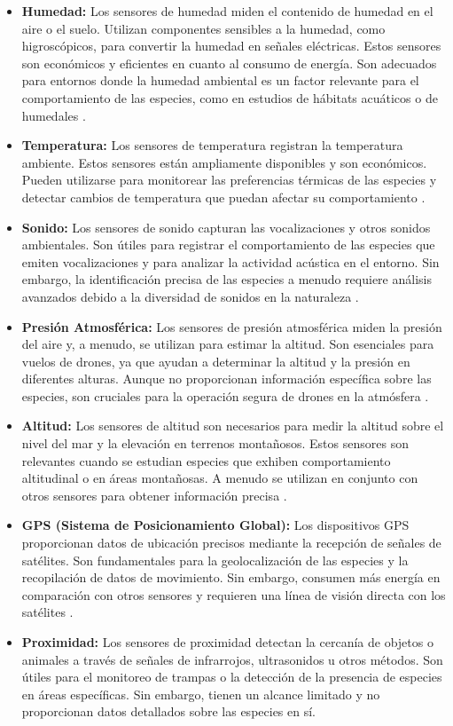 \begin{itemize}
\item \textbf{Humedad:} Los sensores de humedad miden el contenido de humedad en el aire o el suelo. Utilizan componentes sensibles a la humedad, como higroscópicos, para convertir la humedad en señales eléctricas. Estos sensores son económicos y eficientes en cuanto al consumo de energía. Son adecuados para entornos donde la humedad ambiental es un factor relevante para el comportamiento de las especies, como en estudios de hábitats acuáticos o de humedales \cite{75}.
\item \textbf{Temperatura:} Los sensores de temperatura registran la temperatura ambiente. Estos sensores están ampliamente disponibles y son económicos. Pueden utilizarse para monitorear las preferencias térmicas de las especies y detectar cambios de temperatura que puedan afectar su comportamiento \cite{76}.
\item \textbf{Sonido:} Los sensores de sonido capturan las vocalizaciones y otros sonidos ambientales. Son útiles para registrar el comportamiento de las especies que emiten vocalizaciones y para analizar la actividad acústica en el entorno. Sin embargo, la identificación precisa de las especies a menudo requiere análisis avanzados debido a la diversidad de sonidos en la naturaleza \cite{77}.
\item \textbf{Presión Atmosférica:} Los sensores de presión atmosférica miden la presión del aire y, a menudo, se utilizan para estimar la altitud. Son esenciales para vuelos de drones, ya que ayudan a determinar la altitud y la presión en diferentes alturas. Aunque no proporcionan información específica sobre las especies, son cruciales para la operación segura de drones en la atmósfera \cite{78}.
\item \textbf{Altitud:} Los sensores de altitud son necesarios para medir la altitud sobre el nivel del mar y la elevación en terrenos montañosos. Estos sensores son relevantes cuando se estudian especies que exhiben comportamiento altitudinal o en áreas montañosas. A menudo se utilizan en conjunto con otros sensores para obtener información precisa \cite{79}.
\item \textbf{GPS (Sistema de Posicionamiento Global):} Los dispositivos GPS proporcionan datos de ubicación precisos mediante la recepción de señales de satélites. Son fundamentales para la geolocalización de las especies y la recopilación de datos de movimiento. Sin embargo, consumen más energía en comparación con otros sensores y requieren una línea de visión directa con los satélites \cite{80}.
\item \textbf{Proximidad:} Los sensores de proximidad detectan la cercanía de objetos o animales a través de señales de infrarrojos, ultrasonidos u otros métodos. Son útiles para el monitoreo de trampas o la detección de la presencia de especies en áreas específicas. Sin embargo, tienen un alcance limitado y no proporcionan datos detallados sobre las especies en sí.\cite{81}

\end{itemize}
